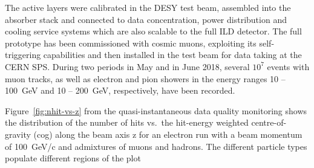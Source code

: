 The active layers were calibrated in the DESY test beam, assembled into the absorber stack and connected to data concentration, power distribution and cooling service systems which are also scalable to the full ILD detector. 
The full prototype has been commissioned with cosmic muons, exploiting its self-triggering capabilities and then
installed in the test beam for data taking at the CERN SPS.
During two periods in May and in June 2018, several $10^7$ events with muon tracks, as well as electron and pion showers in the energy ranges  10 -- 100~GeV and 10 -- 200~GeV, respectively, have been recorded. 

Figure~\ref{fig:nhit-vs-z} from the quasi-instantaneous data quality monitoring shows the distribution of the number of hits vs.\ the hit-energy weighted centre-of-gravity (cog) along the beam axis z for an electron run with a beam momentum of 100~GeV/c and admixtures of muons and hadrons. The different particle types populate different regions of the plot


